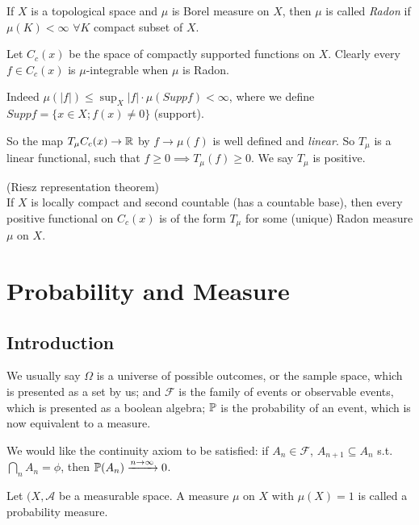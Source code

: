 \documentclass[a4paper]{article}
\begin{document}
\begin{defi}
If $X$ is a topological space and $\mu$ is Borel measure on $X$, then $\mu$ is called \emph{Radon} if $\mu(K) < \infty$ $\forall K$ compact subset of $X$.

Let $C_c(x)$ be the space of compactly supported functions on $X$. Clearly every $f \in C_c(x)$ is $\mu$-integrable when $\mu$ is Radon.

Indeed $\mu(|f|) \leq \sup_X |f| \cdot \mu (Supp f) < \infty$, where we define $Supp f = \{x \in X; f(x) \neq 0\}$ (support).

So the map $T_\mu C_c(x) \to \R$ by $f \to \mu(f)$ is well defined and \emph{linear}. So $T_\mu$ is a linear functional, such that $f \geq 0 \implies T_\mu(f) \geq 0$. We say $T_\mu$ is positive.
\end{defi}

\begin{thm} (Riesz representation theorem)\\
If $X$ is locally compact and second countable (has a countable base), then every positive functional on $C_c(x)$ is of the form $T_\mu$ for some (unique) Radon measure $\mu$ on $X$.
\end{thm}

\newpage

\section{Probability and Measure}

\subsection{Introduction}

We usually say $\Omega$ is a universe of possible outcomes, or the sample space, which is presented as a set by us; and $\mathcal{F}$ is the family of events or observable events, which is presented as a boolean algebra; $\P$ is the probability of an event, which is now equivalent to a measure.

We would like the continuity axiom to be satisfied: if $A_n \in \mathcal{F}$, $A_{n+1} \subseteq A_n$ s.t. $\bigcap_n A_n = \phi$, then $\P(A_n) \xrightarrow{n \to \infty} 0$.

\begin{defi}
Let $(X,\mathcal{A}$ be a measurable space. A measure $\mu$ on $X$ with $\mu(X) = 1$ is called a probability measure.
\end{defi}
\end{document}
